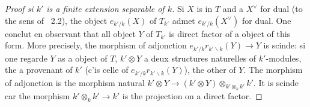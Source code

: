 \documentclass[11pt,a4paper]{article}
\theoremstyle{plain}
\theoremstyle{definition}
\begin{document}
\begin{proof}[Proof si $k'$ is a finite extension separable of $k$]
Si $X$ is in $T$ and a $X^\vee$ for dual (to the sens of \cite{Deligne1990}~2.2), the object $e_{k'/k}(X)$ of $T_{k'}$ admet $e_{k'/k}(X^\vee)$ for dual. One conclut en observant that all object $Y$ of $T_{k'}$ is direct factor of a object of this form. More precisely, the morphism of adjonction $e_{k'/k} r_{k' \backslash k}(Y) \to Y$ is scinde: si one regarde $Y$ as a object of $T$, $k' \otimes Y$ a deux structures naturelles of $k'$-modules, the a provenant of $k'$ (c'is celle of $e_{k'/k} r_{k' \backslash k}(Y)$), the other of $Y$. The morphism of adjonction is the morphism natural $k' \otimes Y \to (k' \otimes Y) \otimes_{k' \otimes_k k'} k'$. It is scinde car the morphism $k' \otimes_k k' \to k'$ is the projection on a direct factor.
\end{proof}
\end{document}
